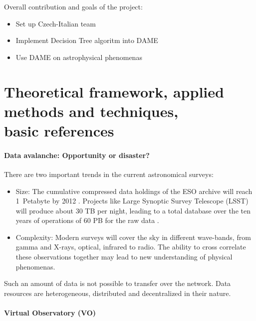 \documentclass[a4paper,10pt,oneside,onecolumn]{article}
\begin{document}
Overall contribution and goals of the project:
\begin{itemize}
 \item \vspace{-0.3cm} Set up Czech-Italian team
 \item \vspace{-0.3cm} Implement Decision Tree algoritm into DAME
 \item \vspace{-0.3cm} Use DAME on astrophysical phenomenas

\end{itemize}


\newpage
\section{Theoretical framework, applied methods and techniques,\\ basic references}
\paragraph{Data avalanche: Opportunity or disaster?}

\bigskip


There are two important trends in the current astronomical surveys:

\begin{itemize}

  \item{Size:} The cumulative compressed data holdings of the ESO archive will
    reach 1~Petabyte by 2012 \cite{hanisch2010international}. Projects
    like Large Synoptic Survey Telescope (LSST) will produce about 30
    TB per night, leading to a total database over the ten years of
    operations of 60 PB for the raw data \cite{becla2006designing}.
   
  \item{Complexity:} Modern surveys will cover the sky in different
    wave-bands, from gamma and X-rays, optical, infrared to radio. The
    ability to cross correlate these observations together may lead to
    new understanding of physical
    phenomenas. \cite{hanisch2010international}
\end{itemize}



\noindent Such an amount of data is not possible to transfer over the
network. Data resources are heterogeneous, distributed and
decentralized in their nature.

\paragraph{Virtual Observatory (VO)}
\end{document}
